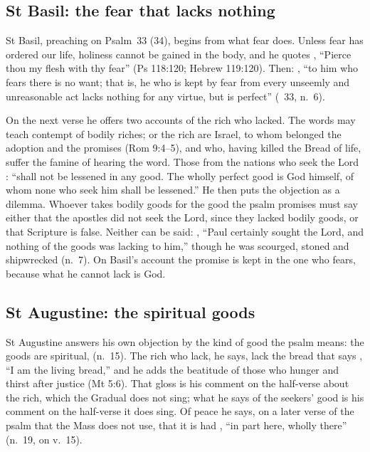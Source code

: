 \subsection{St Basil: the fear that lacks nothing}
\label{sec:no-want-basil}

St Basil, preaching on Psalm~33 (34), begins from what fear does. Unless fear
has ordered our life, holiness cannot be gained in the body, and he quotes
, ``Pierce thou my flesh with thy fear''
(Ps 118:120; Hebrew 119:120). Then: , ``to him who fears there is no want;
that is, he who is kept by fear from every unseemly and unreasonable act lacks
nothing for any virtue, but is perfect'' (\ 33, n.~6).

On the next verse he offers two accounts of the rich who lacked. The words may
teach contempt of bodily riches; or the rich are Israel, to whom belonged the
adoption and the promises (Rom 9:4--5), and who, having killed the Bread of
life, suffer the famine of hearing the word. Those from the nations who seek
the Lord : ``shall not be lessened in any
good. The wholly perfect good is God himself, of whom none who seek him shall
be lessened.'' He then puts the objection as a dilemma. Whoever takes bodily
goods for the good the psalm promises must say either that the apostles did
not seek the Lord, since they lacked bodily goods, or that Scripture is false.
Neither can be said: , ``Paul certainly sought the Lord, and nothing of the goods
was lacking to him,'' though he was scourged, stoned and shipwrecked (n.~7).
On Basil's account the promise is kept in the one who fears, because what he
cannot lack is God.

\subsection{St Augustine: the spiritual goods}
\label{sec:no-want-augustine}

St Augustine answers his own objection by the kind of good the psalm means:
the goods are spiritual,  (n.~15). The rich who
lack, he says, lack the bread that says , ``I am the
living bread,'' and he adds the beatitude of those who hunger and thirst after
justice (Mt 5:6). That gloss is his comment on the half-verse about the rich,
which the Gradual does not sing; what he says of the seekers' good is his
comment on the half-verse it does sing. Of peace he says, on a later verse of
the psalm that the Mass does not use, that it is had , ``in part here, wholly there'' (n.~19, on v.~15).

